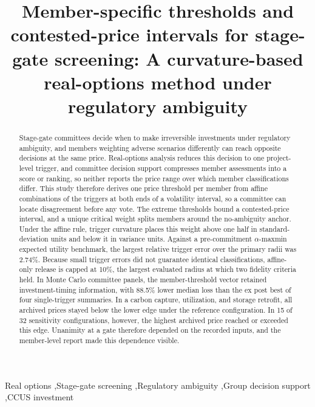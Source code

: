 \documentclass[5p,times,authoryear]{elsarticle}
\theoremstyle{plain}
\begin{document}
\linenumbers

\begin{frontmatter}

\title{Member-specific thresholds and contested-price intervals for stage-gate screening: A curvature-based real-options method under regulatory ambiguity}

\begin{abstract}
Stage-gate committees decide when to make irreversible investments under regulatory ambiguity, and members weighting adverse scenarios differently can reach opposite decisions at the same price. Real-options analysis reduces this decision to one project-level trigger, and committee decision support compresses member assessments into a score or ranking, so neither reports the price range over which member classifications differ. This study therefore derives one price threshold per member from affine combinations of the triggers at both ends of a volatility interval, so a committee can locate disagreement before any vote. The extreme thresholds bound a contested-price interval, and a unique critical weight splits members around the no-ambiguity anchor. Under the affine rule, trigger curvature places this weight above one half in standard-deviation units and below it in variance units. Against a pre-commitment $\alpha$-maxmin expected utility benchmark, the largest relative trigger error over the primary radii was 2.74\%. Because small trigger errors did not guarantee identical classifications, affine-only release is capped at 10\%, the largest evaluated radius at which two fidelity criteria held. In Monte Carlo committee panels, the member-threshold vector retained investment-timing information, with 88.5\% lower median loss than the ex post best of four single-trigger summaries. In a carbon capture, utilization, and storage retrofit, all archived prices stayed below the lower edge under the reference configuration. In 15 of 32 sensitivity configurations, however, the highest archived price reached or exceeded this edge. Unanimity at a gate therefore depended on the recorded inputs, and the member-level report made this dependence visible.
\end{abstract}

\begin{keyword}
Real options \sep Stage-gate screening \sep Regulatory ambiguity \sep Group decision support \sep CCUS investment
\end{keyword}

\end{frontmatter}
\end{document}
